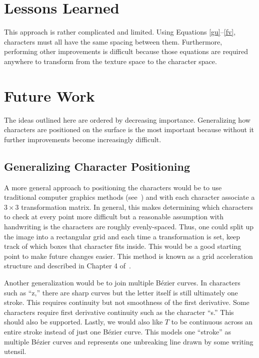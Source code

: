 \documentclass[12pt]{article}
\begin{document}
\section{Lessons Learned}
This approach is rather complicated and limited. Using Equations \eqref{gu}--\eqref{fv}, characters must all have the same spacing between them. Furthermore, performing other improvements is difficult because those equations are required anywhere to transform from the texture space to the character space.

\section{Future Work}
The ideas outlined here are ordered by decreasing importance. Generalizing how characters are positioned on the surface is the most important because without it further improvements become increasingly difficult.

\subsection{Generalizing Character Positioning}
A more general approach to positioning the characters would be to use traditional computer graphics methods (see~\cite{pbrt}) and with each character associate a $3 \times 3$ transformation matrix. In general, this makes determining which characters to check at every point more difficult but a reasonable assumption with handwriting is the characters are roughly evenly-spaced. Thus, one could split up the image into a rectangular grid and each time a transformation is set, keep track of which boxes that character fits inside. This would be a good starting point to make future changes easier. This method is known as a grid acceleration structure and described in Chapter 4 of~\cite{pbrt}.

Another generalization would be to join multiple B\'ezier curves. In characters such as ``z,'' there are sharp curves but the letter itself is still ultimately one stroke. This requires continuity but not smoothness of the first derivative. Some characters require first derivative continuity such as the character ``s.'' This should also be supported. Lastly, we would also like $T$ to be continuous across an entire stroke instead of just one B\'ezier curve. This models one ``stroke'' as multiple B\'ezier curves and represents one unbreaking line drawn by some writing utensil.
\end{document}
